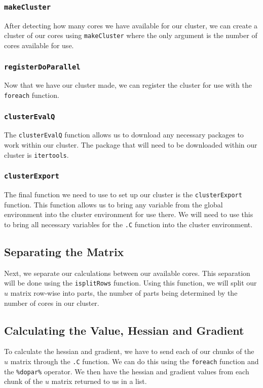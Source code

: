 \documentclass{article}
\begin{document}
\subsubsection{\texttt{makeCluster}}
After detecting how many cores we have available for our cluster, we can create a cluster of our cores using \texttt{makeCluster} where the only argument is the number of cores available for use. 

\subsubsection{\texttt{registerDoParallel}}
Now that we have our cluster made, we can register the cluster for use with the \texttt{foreach} function.

\subsubsection{\texttt{clusterEvalQ}}
The \texttt{clusterEvalQ} function allows us to download any necessary packages to work within our cluster. The package that will need to be downloaded within our cluster is \texttt{itertools}.

\subsubsection{\texttt{clusterExport}}
The final function we need to use to set up our cluster is the \texttt{clusterExport} function. This function allows us to bring any variable from the global environment into the cluster environment for use there. We will need to use this to bring all necessary variables for the \texttt{.C} function into the cluster environment.

\subsection{Separating the Matrix}
Next, we separate our calculations between our available cores. This separation will be done using the \texttt{isplitRows} function. Using this function, we will split our $u$ matrix row-wise into parts, the number of parts being determined by the number of cores in our cluster.

\subsection{Calculating the Value, Hessian and Gradient}
To calculate the hessian and gradient, we have to send each of our chunks of the $u$ matrix through the \texttt{.C} function. We can do this using the \texttt{foreach} function and the \texttt{\%dopar\%} operator. We then have the hessian and gradient values from each chunk of the $u$ matrix returned to us in a list.
\end{document}
